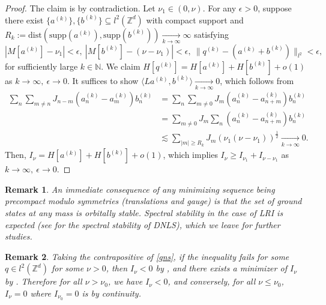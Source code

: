 \documentclass{article}
\numberwithin{equation}{section}
\newtheorem{remark}{Remark}[section]
\begin{document}
\begin{proof}
The claim is by contradiction. Let $\nu_1 \in (0,\nu)$. For any $\epsilon > 0$, suppose there exist $\{a^{(k)}\},\{b^{(k)}\} \subseteq l^2(\mathbb{Z}^d)$ with compact support and $R_k := \text{dist}(\text{supp}(a^{(k)}),\text{supp}(b^{(k)}))\xrightarrow[k\rightarrow \infty]{}\infty$ satisfying 
\begin{equation}\label{dichom}
    |M[a^{(k)}] - \nu_1| < \epsilon,\ |M[b^{(k)}] - (\nu - \nu_1)| < \epsilon,\ \| q^{(k)} - (a^{(k)} + b^{(k)})\|_{l^2} < \epsilon,
\end{equation}
for sufficiently large $k \in \mathbb{N}$. We claim $H[q^{(k)}] = H[a^{(k)}] + H[b^{(k)}] + o(1)$ as $k \rightarrow \infty,\ \epsilon \rightarrow 0$. It suffices to show $\langle La^{(k)},b^{(k)}\rangle \xrightarrow[k \rightarrow \infty]{}0$, which follows from
\begin{equation*}
\begin{split}
    \sum_{n} \sum_{m \neq n} J_{n-m} (a^{(k)}_n - a^{(k)}_m) b^{(k)}_n &= \sum_{n} \sum_{m \neq 0} J_{m}(a^{(k)}_n - a^{(k)}_{n+m}) b^{(k)}_n\\
    &= \sum_{m \neq 0} J_{m} \sum_{n} (a^{(k)}_n - a^{(k)}_{n+m})b^{(k)}_n\\
    &\lesssim \sum_{|m| \geq R_k} J_{m} (\nu_1 (\nu - \nu_1))^{\frac{1}{2}} \xrightarrow[k\rightarrow \infty]{}0.
\end{split}
\end{equation*}
Then, $I_\nu = H[a^{(k)}] + H[b^{(k)}] + o(1)$, which implies $I_\nu \geq I_{\nu_1} + I_{\nu - \nu_1}$ as $k \rightarrow \infty,\ \epsilon \rightarrow 0$.
\end{proof}
\begin{remark}
    An immediate consequence of any minimizing sequence being precompact modulo symmetries (translations and gauge) is that the set of ground states at any mass is orbitally stable. Spectral stability in the case of LRI is expected (see \cite{stefanov2023ground} for the spectral stability of DNLS), which we leave for further studies.
\end{remark}
\begin{remark}\label{r1}
    Taking the contrapositive of \eqref{gns}, if the inequality fails for some $q \in l^2(\mathbb{Z}^d)$ for some $\nu > 0$, then $I_\nu < 0$ by , and there exists a minimizer of $I_\nu$ by . Therefore for all $\nu > \nu_0$, we have $I_\nu < 0$, and conversely, for all $\nu \leq \nu_0$, $I_\nu = 0$ where $I_{\nu_0} = 0$ is by continuity.
\end{remark}
\end{document}
